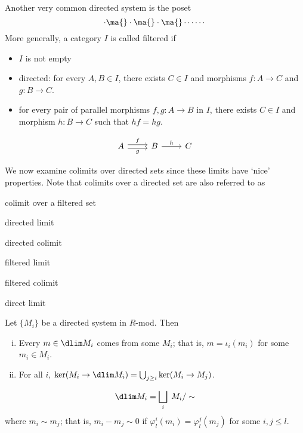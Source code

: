 \begin{ex}
Another very common directed system is the poset
	\[
	\cdot \ma{} \cdot \ma{} \cdot \ma{} \cdots \cdots 
	\]
More generally, a category $I$ is called filtered if 
	\begin{itemize}
	\item $I$ is not empty
	\item directed: for every $A,B \in I$, there exists $C \in I$ and morphisms $f: A \to C$ and $g: B \to C$. 
	\item for every pair of parallel morphisms $f,g: A \to B$ in $I$, there exists $C \in I$ and morphism $h: B \to C$ such that $hf=hg$. 
	\end{itemize}
	\[
	\begin{tikzcd}
	 A \arrow[yshift= 0.5ex]{r}{f} \arrow[yshift= -0.5ex,swap]{r}{g}  & B \arrow{r}{h} & C 
	 \end{tikzcd}
	\] \xqed
\end{ex}


We now examine colimits over directed sets since these limits have `nice' properties. Note that colimits over a directed set are also referred to as
	\begin{2enumerate}
	\item colimit over a filtered set
	\item directed limit
	\item directed colimit
	\item filtered limit
	\item filtered colimit
	\item direct limit
	\end{2enumerate}
	

\begin{lem}
Let $\{M_i\}$ be a directed system in $R$-mod. Then
	\begin{enumerate}[(i)]
	\item Every $m \in \dlim M_i$ comes from some $M_i$; that is, $m=\iota_i(m_i)$ for some $m_i \in M_i$.
	\item For all $i$, $\ker(M_i \to \dlim M_i)= \bigcup_{j \geq i} \ker(M_i \to M_j)$.
	\end{enumerate}
\end{lem}


\begin{cor}
	\[
	\dlim M_i = \bigsqcup_i \; M_i /\sim 
	\]
where $m_i \sim m_j$; that is, $m_i-m_j \sim 0$ if $\varphi_l^i(m_i)=\varphi_l^j(m_j)$ for some $i,j \leq l$. 
\end{cor}


